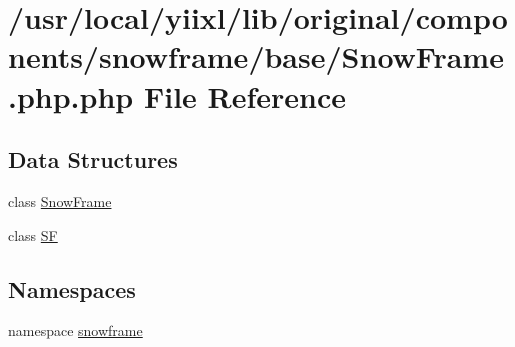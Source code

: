 \hypertarget{SnowFrame_8php_8php}{
\section{/usr/local/yiixl/lib/original/components/snowframe/base/SnowFrame.php.php File Reference}
\label{SnowFrame_8php_8php}
}
\subsection*{Data Structures}
\begin{DoxyCompactItemize}
\item 
class \hyperlink{classSnowFrame}{SnowFrame}
\item 
class \hyperlink{classSF}{SF}
\end{DoxyCompactItemize}
\subsection*{Namespaces}
\begin{DoxyCompactItemize}
\item 
namespace \hyperlink{namespacesnowframe}{snowframe}
\end{DoxyCompactItemize}
